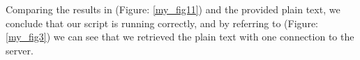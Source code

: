 \documentclass{ieee}
\begin{document}
Comparing the results in (Figure: \ref{my_fig11}) and the provided plain text, we conclude that our script is running correctly, and by referring to (Figure: \ref{my_fig3}) we can see that we retrieved the plain text with one connection to the server.







\end{document}

